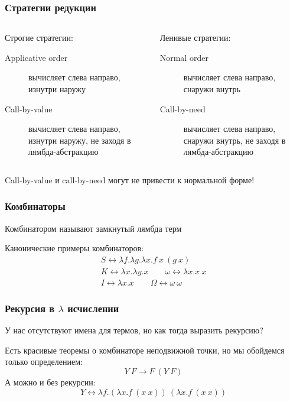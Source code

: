\begin{frame}
    \frametitle{Стратегии редукции}

    \begin{columns}
        \begin{column}{0.5\textwidth}
            Строгие стратегии:
            \begin{description}
                \item[Applicative order] вычисляет слева направо, изнутри наружу
                \item[Call-by-value] вычисляет слева направо, изнутри наружу, не заходя в лямбда-абстракцию
            \end{description}
        \end{column}
        \begin{column}{0.5\textwidth}
            Ленивые стратегии:
            \begin{description}
                \item[Normal order] вычисляет слева направо, снаружи внутрь
                \item[Call-by-need] вычисляет слева направо, снаружи внутрь, не заходя в лямбда-абстракцию
            \end{description}
        \end{column}
    \end{columns}
    Call-by-value и call-by-need могут не привести к нормальной форме!
\end{frame}

\begin{frame}
    \frametitle{Комбинаторы}

    \begin{definition}
        Комбинатором называют замкнутый лямбда терм
    \end{definition}

    Канонические примеры комбинаторов:
    \begin{gather*}
        S \leftrightarrow \lambda f. \lambda g. \lambda x. f\ x\ (g\ x) \\
        K \leftrightarrow \lambda x. \lambda y. x \qquad \omega \leftrightarrow \lambda x. x\ x\\
        I \leftrightarrow \lambda x. x \qquad \Omega \leftrightarrow \omega\ \omega
    \end{gather*}
\end{frame}

\begin{frame}
    \frametitle{Рекурсия в $\lambda$ исчислении}

    У нас отсутствуют имена для термов, но как тогда выразить рекурсию?

    Есть красивые теоремы о комбинаторе неподвижной точки, но мы обойдемся только определением:
    \[Y\ F \rightarrow F\ (Y\ F)\]
    А можно и без рекурсии:
    \[Y \leftrightarrow \lambda f. (\lambda x.f\ (x\ x))\ (\lambda x.f\ (x\ x))\]

\end{frame}

